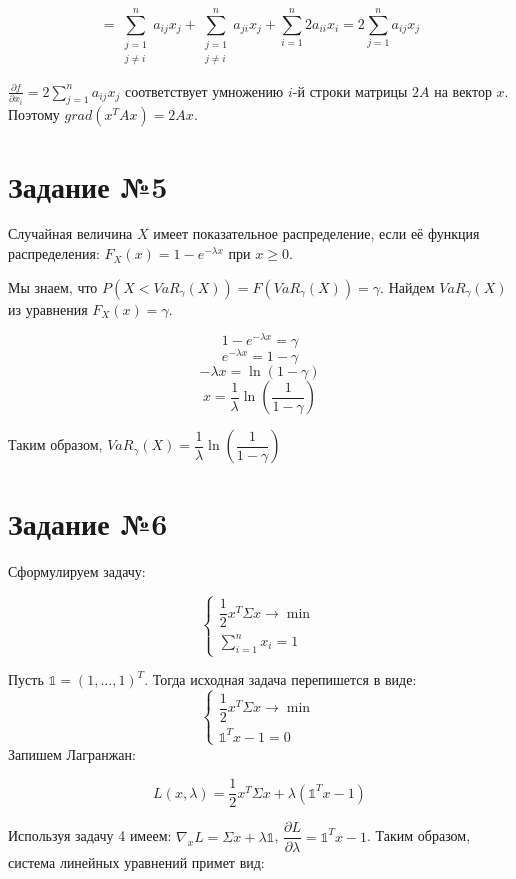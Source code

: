\documentclass[a4paper,14pt]{extarticle}
\theoremstyle{definition}
\begin{document}
$$
= \sum_{\begin{smallmatrix}j=1 \\ j \neq i\end{smallmatrix}}^{n} a_{ij}x_j 
+ \sum_{\begin{smallmatrix}j=1 \\ j \neq i\end{smallmatrix}}^{n} a_{ji}x_j +
\sum_{i=1}^n 2 a_{ii} x_i = 2 \sum_{j=1}^n a_{ij} x_j
$$

$\frac{\partial f}{\partial x_i} = 2 \sum_{j=1}^n a_{ij} x_j$ соответствует умножению $i$-й строки матрицы $2A$ на вектор $x$. Поэтому
$grad(x^T A x) = 2Ax$.

\section{Задание №5}
Случайная величина $X$ имеет показательное распределение, если её функция распределения:
$F_X(x)=1-e^{-\lambda x}$ при $x\geq 0$.

Мы знаем, что $P(X<VaR_\gamma(X))=F(VaR_\gamma(X))=\gamma$.
Найдем $VaR_\gamma(X)$ из уравнения $F_X(x)=\gamma$.

$$
1-e^{-\lambda x} = \gamma
$$
$$
e^{-\lambda x} = 1-\gamma
$$
$$
-\lambda x = \ln(1-\gamma)
$$
$$
x = \dfrac{1}{\lambda} \ln \left(\dfrac{1}{1-\gamma}\right)
$$

Таким образом, $VaR_\gamma(X)=\dfrac{1}{\lambda} \ln \left(\dfrac{1}{1-\gamma}\right)$

\section{Задание №6}
Сформулируем задачу:

$$
\begin{cases}
    \dfrac{1}{2} x^T \Sigma x \to \min \\
    \sum_{i=1}^{n} x_i = 1
\end{cases}
$$

Пусть $\mathbb{1}=(1,\ldots,1)^T$. Тогда исходная задача перепишется в виде:
$$
\begin{cases}
    \dfrac{1}{2} x^T \Sigma x \to \min \\
    \mathbb{1}^T x - 1 = 0
\end{cases}
$$
Запишем Лагранжан:

$$
L(x,\lambda) = \dfrac{1}{2} x^T \Sigma x + \lambda (\mathbb{1}^T x - 1)
$$

Используя задачу 4 имеем: $\nabla_x L = \Sigma x + \lambda \mathbb{1}$, $\dfrac{\partial L}{\partial \lambda} = \mathbb{1}^T x - 1$.
Таким образом, система линейных уравнений примет вид:
\end{document}
